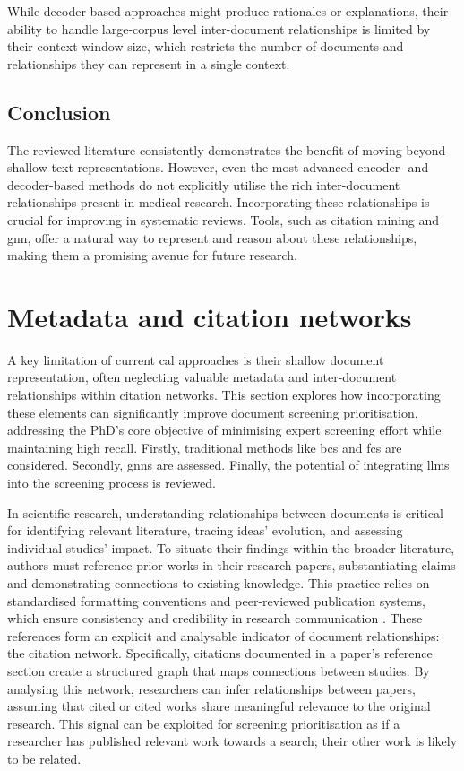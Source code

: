 \documentclass[10pt,oneside]{book}
\begin{document}
While decoder-based approaches might produce rationales or explanations, their ability to handle large-corpus level inter-document relationships is limited by their context window size, which restricts the number of documents and relationships they can represent in a single context.

\subsection{Conclusion}
The reviewed literature consistently demonstrates the benefit of moving beyond shallow text representations. However, even the most advanced encoder- and decoder-based methods do not explicitly utilise the rich inter-document relationships present in medical research.  Incorporating these relationships is crucial for improving  in systematic reviews. Tools, such as citation mining and \gls*{gnn}, offer a natural way to represent and reason about these relationships, making them a promising avenue for future research.

\section{Metadata and citation networks}\label{sec:metadata}


A key limitation of current \gls*{cal} approaches is their shallow document representation, often neglecting valuable metadata and inter-document relationships within citation networks. This section explores how incorporating these elements can significantly improve document screening prioritisation, addressing the PhD's core objective of minimising expert screening effort while maintaining high recall. Firstly, traditional methods like \gls*{bcs} and \gls*{fcs} are considered. Secondly, \glspl*{gnn} are assessed. Finally, the potential of integrating \glspl*{llm} into the screening process is reviewed.

In scientific research, understanding relationships between documents is critical for identifying relevant literature, tracing ideas' evolution, and assessing individual studies' impact. To situate their findings within the broader literature, authors must reference prior works in their research papers, substantiating claims and demonstrating connections to existing knowledge. This practice relies on standardised formatting conventions and peer-reviewed publication systems, which ensure consistency and credibility in research communication \cite{noauthor_bmc_nodate}. These references form an explicit and analysable indicator of document relationships: the citation network. Specifically, citations documented in a paper's reference section create a structured graph that maps connections between studies. By analysing this network, researchers can infer relationships between papers, assuming that cited or cited works share meaningful relevance to the original research. This signal can be exploited for screening prioritisation as if a researcher has published relevant work towards a search; their other work is likely to be related.
\end{document}
